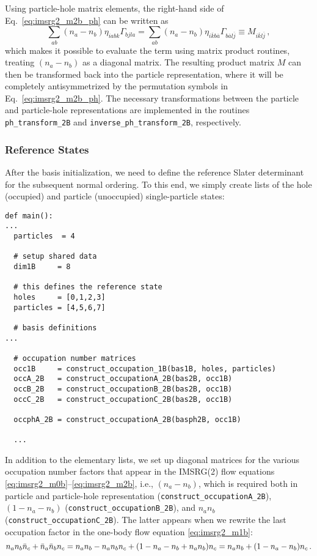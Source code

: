 {Using particle-hole matrix elements, the right-hand side of Eq.~\eqref{eq:imsrg2_m2b_ph} 
can be written as
\begin{equation}
  \sum_{ab}(n_a-n_b)\eta_{iabk}\Gamma_{bjla}
  = \sum_{ab}(n_a-n_b) \eta_{i\overline{k}b\overline{a}}\Gamma_{b\overline{a}l\overline{j}}
  \equiv M_{i\overline{k}l\overline{j}}\,,
\end{equation}
which makes it possible to evaluate the term using matrix product routines,
treating $(n_a-n_b)$ as a diagonal matrix. The resulting product matrix $M$
can then be transformed back into the particle representation, where it will 
be completely antisymmetrized by the permutation symbols in Eq.~\eqref{eq:imsrg2_m2b_ph}. 
The necessary transformations between the particle and particle-hole 
representations are implemented in the routines \texttt{ph\_transform\_2B}
and \texttt{inverse\_ph\_transform\_2B}, respectively.

\subsubsection*{Reference States}
After the basis initialization, we need to define the reference Slater
determinant \ket{\Phi} for the subsequent normal ordering. To this end, 
we simply create lists of the hole (occupied) and particle (unoccupied)
single-particle states:
\begin{lstlisting}
def main():
...
  particles  = 4

  # setup shared data
  dim1B     = 8

  # this defines the reference state
  holes     = [0,1,2,3]
  particles = [4,5,6,7]

  # basis definitions
...

  # occupation number matrices
  occ1B     = construct_occupation_1B(bas1B, holes, particles)
  occA_2B   = construct_occupationA_2B(bas2B, occ1B)
  occB_2B   = construct_occupationB_2B(bas2B, occ1B)
  occC_2B   = construct_occupationC_2B(bas2B, occ1B)

  occphA_2B = construct_occupationA_2B(basph2B, occ1B)

  ...
\end{lstlisting}
In addition to the elementary lists, we set up diagonal matrices for
the various occupation number factors that appear in the IMSRG(2)
flow equations \eqref{eq:imsrg2_m0b}--\eqref{eq:imsrg2_m2b},
i.e., $(n_a - n_b)$, which is required both in particle and particle-hole
representation (\texttt{construct\_occupationA\_2B}), $(1-n_a-n_b)$
(\texttt{construct\_occupationB\_2B}), and $n_a n_b$ (\texttt{construct\_occupationC\_2B}).
The latter appears when we rewrite the last occupation factor in 
the one-body flow equation \eqref{eq:imsrg2_m1b}:
\begin{equation}
  n_a n_b \bar{n}_c + \bar{n}_a \bar{n}_b n_c = n_a n_b - n_a n_b n_c + (1 - n_a - n_b + n_a n_b) n_c
  = n_a n_b + (1-n_a - n_b)n_c\,.
\end{equation}

}
